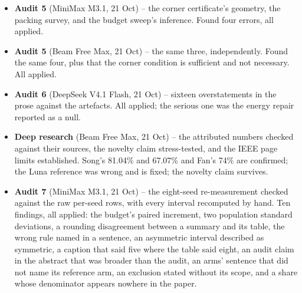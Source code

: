 \documentclass[11pt,a4paper]{article}
\begin{document}
\begin{itemize}[leftmargin=1.15em,itemsep=4pt,topsep=2pt,label={\color{uavblue}\scriptsize\textbullet}]
\begin{itemize}[leftmargin=1.25em,itemsep=1.5pt,topsep=2pt,label={\color{uavmuted}\scriptsize\textendash}]
\item \textbf{The matched budget does not control for budget-conditionality or for redundancy between components.} -> the paper says so, and says a budget sweep would be needed.
\item \textbf{"A training run is deterministic given its seed" was not established.} -> now established by two tests and by audit item T1 (the seed is set BEFORE the networks are constructed, so the initialisation is seeded too).
\item \textbf{The deterministic-vs-sampled comparison.} The paper's argmax row already settles the sampling-handicap objection, and the heuristic's information advantage is now stated as a limitation.
\item The audit's recommendations NOT taken, and why: raising the seed count to 10+ (the compute does not fit the deadline, so the paper reports intervals and a resolution instead of verdicts), decoupling the scene and action streams (would need the whole matrix re-measured), and a budget sweep (same reason). Each audit gets a SELF-CONTAINED brief: the setting, the model, the measured numbers, and the exact claims to check, because a fresh subagent has no context. It is instructed to work purely mathematically (no web, no code, no repository) and to be adversarial rather than agreeable.
\end{itemize}
\item \textbf{Audit 5} (MiniMax M3.1, 21 Oct) -- the corner certificate's geometry, the packing survey, and the budget sweep's inference. Found four errors, all applied.
\item \textbf{Audit 5} (Beam Free Max, 21 Oct) -- the same three, independently. Found the same four, plus that the corner condition is sufficient and not necessary. All applied.
\item \textbf{Audit 6} (DeepSeek V4.1 Flash, 21 Oct) -- sixteen overstatements in the prose against the artefacts. All applied; the serious one was the energy repair reported as a null.
\item \textbf{Deep research} (Beam Free Max, 21 Oct) -- the attributed numbers checked against their sources, the novelty claim stress-tested, and the IEEE page limits established. Song's 81.04\% and 67.07\% and Fan's 74\% are confirmed; the Luna reference was wrong and is fixed; the novelty claim survives.
\item \textbf{Audit 7} (MiniMax M3.1, 21 Oct) -- the eight-seed re-measurement checked against the raw per-seed rows, with every interval recomputed by hand. Ten findings, all applied: the budget's paired increment, two population standard deviations, a rounding disagreement between a summary and its table, the wrong rule named in a sentence, an asymmetric interval described as symmetric, a caption that said five where the table said eight, an audit claim in the abstract that was broader than the audit, an arms' sentence that did not name its reference arm, an exclusion stated without its scope, and a share whose denominator appears nowhere in the paper.

\end{itemize}
\end{document}
